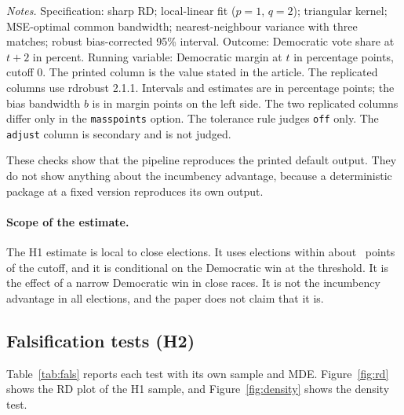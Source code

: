 \documentclass[11pt]{article}
\begin{document}
\begin{table}[t]
\centering
\caption{Replication of the default output of \citet{calonico2017rdrobust}, Section 7.2 (H1).}
\label{tab:main}
\resizebox{\textwidth}{!}{}
\par\smallskip
\footnotesize
\textit{Notes.} Specification: sharp RD; local-linear fit ($p=1$, $q=2$); triangular kernel; MSE-optimal common bandwidth; nearest-neighbour variance with three matches; robust bias-corrected 95\% interval. Outcome: Democratic vote share at $t+2$ in percent. Running variable: Democratic margin at $t$ in percentage points, cutoff 0. The printed column is the value stated in the article. The replicated columns use rdrobust 2.1.1. Intervals and estimates are in percentage points; the bias bandwidth $b$ is in margin points on the left side. The two replicated columns differ only in the \texttt{masspoints} option. The tolerance rule judges \texttt{off} only. The \texttt{adjust} column is secondary and is not judged.
\end{table}

These checks show that the pipeline reproduces the printed default output. They do not show anything about the incumbency advantage, because a deterministic package at a fixed version reproduces its own output.

\paragraph{Scope of the estimate.}
The H1 estimate is local to close elections. It uses elections within about \RdBw\ points of the cutoff, and it is conditional on the Democratic win at the threshold. It is the effect of a narrow Democratic win in close races. It is not the incumbency advantage in all elections, and the paper does not claim that it is.

\subsection{Falsification tests (H2)}

Table~\ref{tab:fals} reports each test with its own sample and MDE. Figure~\ref{fig:rd} shows the RD plot of the H1 sample, and Figure~\ref{fig:density} shows the density test.
\end{document}

